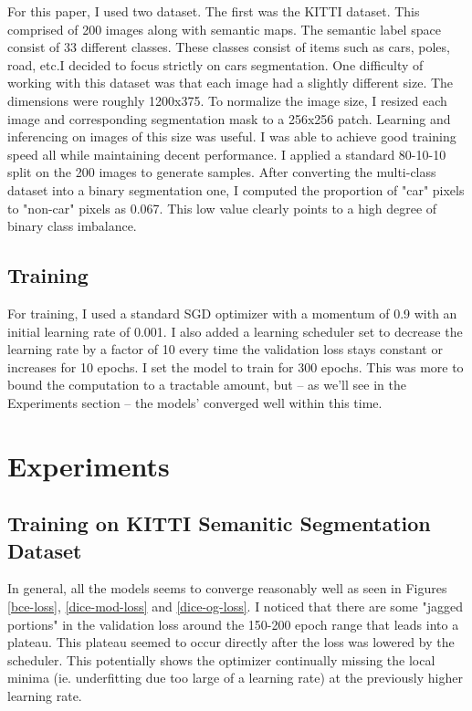\documentclass[Location Location Location! : Exploring Image Segmentation Problem In Urban Driving Scenarios]{IEEEtran}
\begin{document}
For this paper, I used two dataset. The first was the KITTI \cite{kitti} dataset. This comprised of 200 images along with semantic maps. The semantic label space consist of 33 different classes. These classes consist of items such as cars, poles, road, etc.I decided to focus strictly on cars segmentation. One difficulty of working with this dataset was that each image had a slightly different size. The dimensions were roughly 1200x375. To normalize the image size, I resized each image and corresponding segmentation mask to a 256x256 patch. Learning and inferencing on images of this size was useful. I was able to achieve good training speed all while maintaining decent performance. I applied a standard 80-10-10 split on the 200 images to generate samples. After converting the multi-class dataset into a binary segmentation one, I computed the proportion of "car" pixels to "non-car" pixels as 0.067. This low value clearly points to a high degree of binary class imbalance. 

\subsection{Training}

For training, I used a standard SGD optimizer with a momentum of 0.9 with an initial learning rate of 0.001. I also added a learning scheduler set to decrease the learning rate by a factor of 10 every time the validation loss stays constant or increases for 10 epochs. I set the model to train for 300 epochs. This was more to bound the computation to a tractable amount, but -- as we'll see in the Experiments section -- the models' converged well within this time. 



\section{Experiments}


\subsection{Training on KITTI Semanitic Segmentation Dataset}

In general, all the models seems to converge reasonably well as seen in Figures \ref{bce-loss}, \ref{dice-mod-loss} and \ref{dice-og-loss}. I noticed that there are some "jagged portions" in the validation loss around the 150-200 epoch range that leads into a plateau. This plateau seemed to occur directly after the loss was lowered by the scheduler. This potentially shows the optimizer continually missing the local minima (ie. underfitting due too large of a learning rate) at the previously higher learning rate.  
\end{document}
